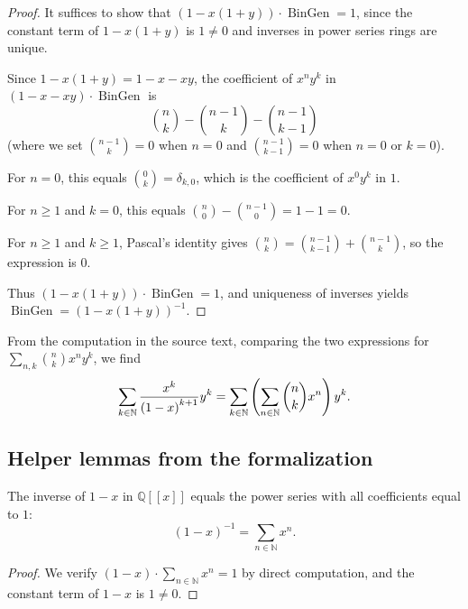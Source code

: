 \begin{proof}
\leanok
It suffices to show that $(1 - x(1+y)) \cdot \operatorname{BinGen} = 1$, since
the constant term of $1 - x(1+y)$ is $1 \neq 0$ and inverses in power series
rings are unique.

Since $1 - x(1+y) = 1 - x - xy$, the coefficient of $x^n y^k$ in
$(1 - x - xy) \cdot \operatorname{BinGen}$ is
\[
\binom{n}{k} - \binom{n-1}{k} - \binom{n-1}{k-1}
\]
(where we set $\binom{n-1}{k} = 0$ when $n = 0$ and $\binom{n-1}{k-1} = 0$
when $n = 0$ or $k = 0$).

For $n = 0$, this equals $\binom{0}{k} = \delta_{k,0}$, which is the
coefficient of $x^0 y^k$ in $1$.

For $n \geq 1$ and $k = 0$, this equals $\binom{n}{0} - \binom{n-1}{0} = 1 - 1 = 0$.

For $n \geq 1$ and $k \geq 1$, Pascal's identity gives
$\binom{n}{k} = \binom{n-1}{k-1} + \binom{n-1}{k}$, so the expression is $0$.

Thus $(1 - x(1+y)) \cdot \operatorname{BinGen} = 1$, and uniqueness of inverses
yields $\operatorname{BinGen} = (1 - x(1+y))^{-1}$.
\end{proof}

From the computation in the source text, comparing the two expressions for
$\sum_{n,k} \binom{n}{k} x^n y^k$, we find
\begin{equation}
\sum_{k\in\mathbb{N}}\dfrac{x^{k}}{\left(  1-x\right)  ^{k+1}}y^{k}=\sum
_{k\in\mathbb{N}}\left(  \sum_{n\in\mathbb{N}}\dbinom{n}{k}x^{n}\right)
y^{k}. \label{eq.fps.mulvar.exa1.xyk}
\end{equation}

\subsection{Helper lemmas from the formalization}

\begin{lemma}
\label{lem.fps.mulvar.one-sub-X-inv}
\leanhelper
\leanok
The inverse of $1 - x$ in $\mathbb{Q}[[x]]$ equals the power series with all
coefficients equal to $1$:
\[
(1 - x)^{-1} = \sum_{n \in \mathbb{N}} x^n.
\]
\end{lemma}

\begin{proof}
We verify $(1-x) \cdot \sum_{n \in \mathbb{N}} x^n = 1$ by direct
computation, and the constant term of $1-x$ is $1 \neq 0$.
\end{proof}

